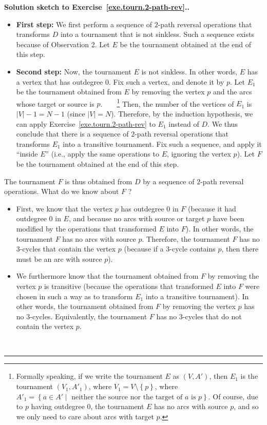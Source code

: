 \documentclass[numbers=enddot,12pt,final,onecolumn,notitlepage]{scrartcl}%
\theoremstyle{definition}
\newenvironment{proof}[1][Proof]{\noindent\textbf{#1.} }{\ \rule{0.5em}{0.5em}}
\newcommand{\set}[1]{\left\{ #1 \right\}}
\newcommand{\abs}[1]{\left| #1 \right|}
\newcommand{\tup}[1]{\left( #1 \right)}
\begin{document}
\begin{proof}[Solution sketch to Exercise~\ref{exe.tourn.2-path-rev}.]
\begin{itemize}
\item \textbf{First step:} We first perform a sequence of
      $2$-path reversal operations that transforms $D$ into a
      tournament that is not sinkless. Such a sequence exists because
      of Observation 2. Let $E$ be the tournament obtained at the end
      of this step.
\item \textbf{Second step:} Now, the tournament $E$ is not sinkless.
      In other words, $E$ has a vertex that has outdegree $0$. Fix
      such a vertex, and denote it by $p$. Let $E_1$ be the
      tournament obtained from $E$ by removing the vertex $p$ and the
      arcs whose target or source is $p$.\ \ \ \ \footnote{Formally
      speaking, if we write the tournament $E$ as $\tup{V, A'}$, then
      $E_1$ is the tournament $\tup{V_1, A'_1}$,
      where $V_1 = V \setminus \set{p}$, where
      $A'_1 = \set{ a \in A' \mid
      \text{ neither the source nor the target of } a \text{ is } p}$.
      Of course, due to $p$ having outdegree $0$, the tournament $E$
      has no arcs with source $p$, and so we only need to care about
      arcs with target $p$.}
      Then, the number of the vertices of $E_1$ is
      $\abs{V} - 1 = N - 1$ (since $\abs{V} = N$). Therefore, by the
      induction hypothesis, we can apply
      Exercise~\ref{exe.tourn.2-path-rev} to $E_1$ instead of $D$.
      We thus conclude that there is a sequence of $2$-path reversal
      operations that transforms $E_1$ into a transitive tournament.
      Fix such a sequence, and apply it ``inside $E$'' (i.e., apply
      the same operations to $E$, ignoring the vertex $p$).
      Let $F$ be the tournament obtained at the end of this step.
\end{itemize}

The tournament $F$ is thus obtained from $D$ by a sequence of
$2$-path reversal operations. What do we know about $F$ ?

\begin{itemize}
\item First, we
know that the vertex $p$ has outdegree $0$ in $F$ (because it had
outdegree $0$ in $E$, and because no arcs with source or target $p$
have been modified by the operations that transformed $E$ into $F$).
In other words, the tournament $F$ has no arcs with source $p$.
Therefore, the tournament $F$ has no $3$-cycles that contain the
vertex $p$ (because if a $3$-cycle contains $p$, then there must be
an arc with source $p$).

\item
We furthermore know that the tournament obtained from $F$ by removing
the vertex $p$ is transitive (because the operations that transformed
$E$ into $F$ were chosen in such a way as to transform $E_1$ into a
transitive tournament). In other words, the tournament obtained from
$F$ by removing the vertex $p$ has no $3$-cycles. Equivalently, the
tournament $F$ has no $3$-cycles that do not contain the vertex $p$.
\end{itemize}


\end{proof}
\end{document}
